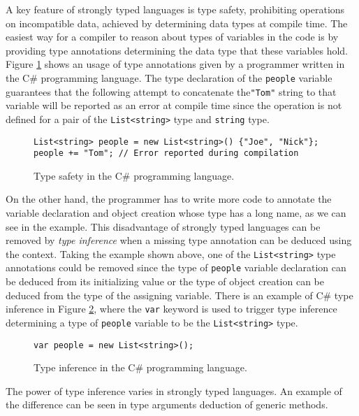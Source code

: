 A key feature of strongly typed languages is type safety, prohibiting operations on incompatible data, achieved by determining data types at compile time. 
The easiest way for a compiler to reason about types of variables in the code is by providing type annotations determining the data type that these variables hold. 
Figure \ref{img01:csharp_type_sef} shows an usage of type annotations given by a programmer written in the C\# programming language. 
The type declaration of the \texttt{people} variable guarantees that the following attempt to concatenate the\texttt{"Tom"} string to that variable will be reported as an error at compile time since the operation is not defined for a pair of the \texttt{List<string>} type and \texttt{string} type.
\begin{figure}[h]
\begin{lstlisting}[style=csharp]
List<string> people = new List<string>() {"Joe", "Nick"};
people += "Tom"; // Error reported during compilation
\end{lstlisting}
\caption{Type safety in the C\# programming language.}
\label{img01:csharp_type_sef}
\end{figure}
\par
On the other hand, the programmer has to write more code to annotate the variable declaration and object creation whose type has a long name, as we can see in the example. 
This disadvantage of strongly typed languages can be removed by \textit{type inference} when a missing type annotation can be deduced using the context. 
Taking the example shown above, one of the \texttt{List<string>} type annotations could be removed since the type of \texttt{people} variable declaration can be deduced from its initializing value or the type of object creation can be deduced from the type of the assigning variable.
There is an example of C\# type inference in Figure \ref{img02:csharp_type_inf}, where the \texttt{var} keyword is used to trigger type inference determining a type of \texttt{people} variable to be the \texttt{List<string>} type.
\begin{figure}[h]
\begin{lstlisting}[style=csharp]
var people = new List<string>();
\end{lstlisting}
\caption{Type inference in the C\# programming language.}
\label{img02:csharp_type_inf}
\end{figure}
\par
The power of type inference varies in strongly typed languages.
An example of the difference can be seen in type arguments deduction of generic methods. 
